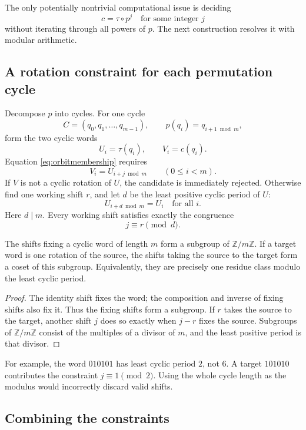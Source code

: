 \documentclass[11pt,a4paper]{article}
\numberwithin{equation}{section}
\theoremstyle{definition}
\theoremstyle{remark}
\newcommand{\Z}{\mathbb Z}
\begin{document}
The only potentially nontrivial computational issue is deciding
\begin{equation}\label{eq:orbitmembership}
 c=\tau\circ p^j\quad\text{for some integer }j
\end{equation}
without iterating through all powers of $p$. The next construction resolves
it with modular arithmetic.

\subsection{A rotation constraint for each permutation cycle}

Decompose $p$ into cycles. For one cycle
\[
 C=(q_0,q_1,\ldots,q_{m-1}),\qquad p(q_i)=q_{i+1\bmod m},
\]
form the two cyclic words
\[
 U_i=\tau(q_i),\qquad V_i=c(q_i).
\]
Equation \eqref{eq:orbitmembership} requires
\[
 V_i=U_{i+j\bmod m}\qquad(0\le i<m).
\]
If $V$ is not a cyclic rotation of $U$, the candidate is immediately rejected.
Otherwise find one working shift $r$, and let $d$ be the least positive
cyclic period of $U$:
\[
 U_{i+d\bmod m}=U_i\quad\text{for all }i.
\]
Here $d\mid m$. Every working shift satisfies exactly the congruence
\begin{equation}\label{eq:shiftcongruence}
 j\equiv r\pmod d.
\end{equation}

\begin{lemma}\label{lem:shiftcoset}
The shifts fixing a cyclic word of length $m$ form a subgroup of
$\Z/m\Z$. If a target word is one rotation of the source, the shifts taking
the source to the target form a coset of this subgroup. Equivalently, they
are precisely one residue class modulo the least cyclic period.
\end{lemma}
\begin{proof}
The identity shift fixes the word; the composition and inverse of fixing
shifts also fix it. Thus the fixing shifts form a subgroup. If $r$ takes the
source to the target, another shift $j$ does so exactly when $j-r$ fixes the
source. Subgroups of $\Z/m\Z$ consist of the multiples of a divisor of $m$,
and the least positive period is that divisor.
\end{proof}

For example, the word $010101$ has least cyclic period $2$, not $6$.
A target $101010$ contributes the constraint $j\equiv1\pmod2$. Using the
whole cycle length as the modulus would incorrectly discard valid shifts.

\subsection{Combining the constraints}
\end{document}

